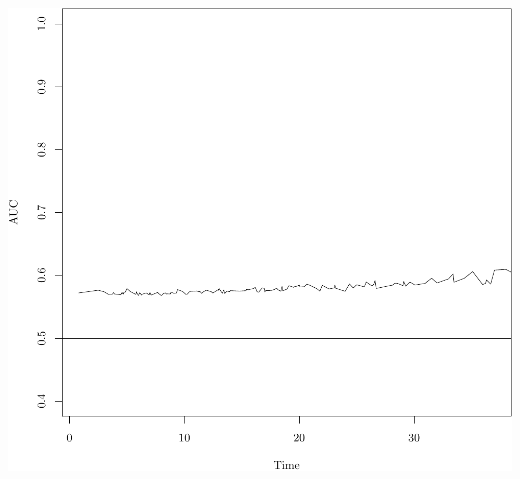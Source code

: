 \documentclass{article}\usepackage[]{graphicx}\usepackage[]{color}
\makeatletter
\def\maxwidth{ %
  \ifdim\Gin@nat@width>\linewidth
    \linewidth
  \else
    \Gin@nat@width
  \fi
}
\newenvironment{knitrout}{}{} %
\makeatother
\begin{document}
\begin{knitrout}
{\centering \includegraphics[width=\maxwidth]{figure/05-risksetROC-8} 

}



\end{knitrout}
\end{document}
